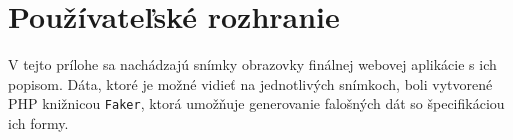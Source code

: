\chapter{Používateľské rozhranie}
V tejto prílohe sa nachádzajú snímky obrazovky finálnej webovej aplikácie s ich popisom. Dáta, ktoré je možné vidieť na jednotlivých snímkoch, boli vytvorené PHP knižnicou \texttt{Faker}, ktorá umožňuje generovanie falošných dát so špecifikáciou ich formy.